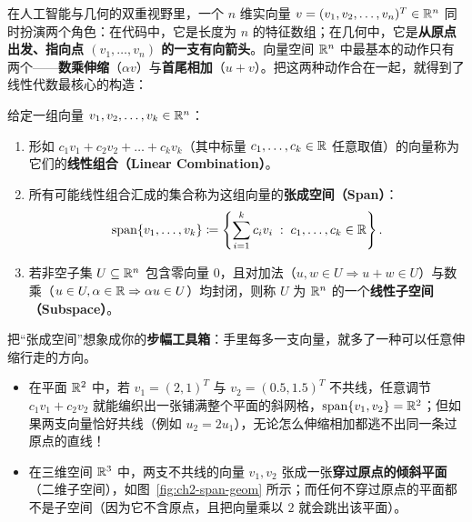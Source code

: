 在人工智能与几何的双重视野里，一个 $n$ 维实向量 $v = (v_1, v_2, \dots, v_n)^T \in \mathbb{R}^n$ 同时扮演两个角色：在代码中，它是长度为 $n$ 的特征数组；在几何中，它是\textbf{从原点出发、指向点 $(v_1, \dots, v_n)$ 的一支有向箭头}。向量空间 $\mathbb{R}^n$ 中最基本的动作只有两个——\textbf{数乘伸缩}（$\alpha v$）与\textbf{首尾相加}（$u + v$）。把这两种动作合在一起，就得到了线性代数最核心的构造：

\begin{defBox}
\begin{definition}\label{def:span-subspace}
给定一组向量 $v_1, v_2, \dots, v_k \in \mathbb{R}^n$：
\begin{enumerate}
  \item 形如 $c_1 v_1 + c_2 v_2 + \dots + c_k v_k$（其中标量 $c_1, \dots, c_k \in \mathbb{R}$ 任意取值）的向量称为它们的\textbf{线性组合（Linear Combination）}。
  \item 所有可能线性组合汇成的集合称为这组向量的\textbf{张成空间（Span）}：
  \[
    \operatorname{span}\{v_1, \dots, v_k\} \coloneqq \left\{\sum_{i=1}^{k} c_i v_i \;:\; c_1, \dots, c_k \in \mathbb{R}\right\}.
  \]
  \item 若非空子集 $U \subseteq \mathbb{R}^n$ 包含零向量 $0$，且对加法（$u, w \in U \Rightarrow u+w \in U$）与数乘（$u \in U, \alpha \in \mathbb{R} \Rightarrow \alpha u \in U$）均封闭，则称 $U$ 为 $\mathbb{R}^n$ 的一个\textbf{线性子空间（Subspace）}。
\end{enumerate}
\end{definition}
\end{defBox}

把“张成空间”想象成你的\textbf{步幅工具箱}：手里每多一支向量，就多了一种可以任意伸缩行走的方向。
\begin{itemize}
  \item 在平面 $\mathbb{R}^2$ 中，若 $v_1 = (2, 1)^T$ 与 $v_2 = (0.5, 1.5)^T$ 不共线，任意调节 $c_1 v_1 + c_2 v_2$ 就能编织出一张铺满整个平面的斜网格，$\operatorname{span}\{v_1, v_2\} = \mathbb{R}^2$；但如果两支向量恰好共线（例如 $u_2 = 2u_1$），无论怎么伸缩相加都逃不出同一条过原点的直线！
  \item 在三维空间 $\mathbb{R}^3$ 中，两支不共线的向量 $v_1, v_2$ 张成一张\textbf{穿过原点的倾斜平面}（二维子空间），如图~\ref{fig:ch2-span-geom} 所示；而任何不穿过原点的平面都不是子空间（因为它不含原点，且把向量乘以 $2$ 就会跳出该平面）。
\end{itemize}

